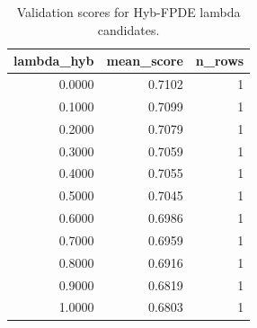 \begin{table}[t]
\caption{Validation scores for Hyb-FPDE lambda candidates.}
\label{tab:lambda_distribution_computed}
\centering
\begin{tabular}{rrr}
\toprule
lambda\_hyb & mean\_score & n\_rows \\
\midrule
0.0000 & 0.7102 & 1 \\
0.1000 & 0.7099 & 1 \\
0.2000 & 0.7079 & 1 \\
0.3000 & 0.7059 & 1 \\
0.4000 & 0.7055 & 1 \\
0.5000 & 0.7045 & 1 \\
0.6000 & 0.6986 & 1 \\
0.7000 & 0.6959 & 1 \\
0.8000 & 0.6916 & 1 \\
0.9000 & 0.6819 & 1 \\
1.0000 & 0.6803 & 1 \\
\bottomrule
\end{tabular}

\end{table}
